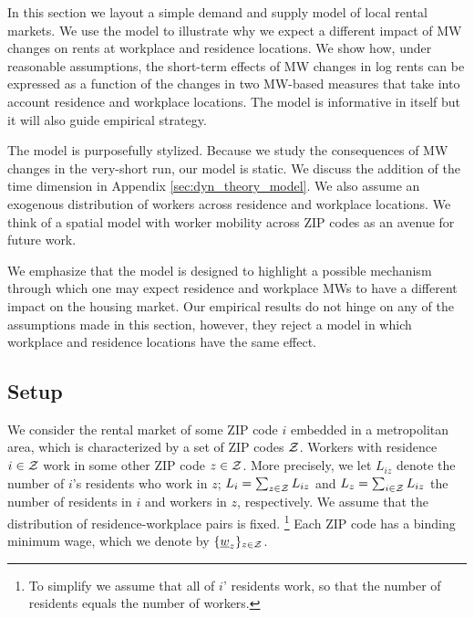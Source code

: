 
In this section we layout a simple demand and supply model of local rental markets.
We use the model to illustrate why we expect a different impact of MW changes 
on rents at workplace and residence locations. We show how, under reasonable 
assumptions, the short-term effects of MW changes in log rents can be expressed 
as a function of the changes in two MW-based measures that take into account 
residence and workplace locations. The model is informative in itself but it will
also guide empirical strategy.

The model is purposefully stylized.
Because we study the consequences of MW changes in the very-short run, our model is 
static. 
We discuss the addition of the time dimension in Appendix \ref{sec:dyn_theory_model}.
We also assume an exogenous distribution of workers across residence and workplace 
locations.
We think of a spatial model with worker mobility across ZIP codes as an avenue 
for future work.

We emphasize that the model is designed to highlight a possible mechanism through 
which one may expect residence and workplace MWs to have a different impact on the 
housing market. Our empirical results do not hinge on any of the assumptions made 
in this section, however, they reject a model in which workplace and residence locations
have the same effect.

\subsection{Setup}

We consider the rental market of some ZIP code $i$ embedded in a metropolitan area, 
which is characterized by a set of ZIP codes $\mathcal{Z}$.
Workers with residence $i\in\mathcal{Z}$ work in some other ZIP code $z\in\mathcal{Z}$. 
More precisely, we let $L_{iz}$ denote the number of $i$'s residents who work in $z$;
$L_i = \sum_{z \in \mathcal{Z}} L_{iz}$ and $L_z = \sum_{i \in \mathcal{Z}} L_{iz}$ 
the number of residents in $i$ and workers in $z$, respectively.
We assume that the distribution of residence-workplace pairs is fixed.%
\footnote{To simplify we assume that all of $i$' residents work, so that the number
of residents equals the number of workers.}
Each ZIP code has a binding minimum wage, which we denote by 
$\{\underline{w}_z\}_{z\in\mathcal{Z}}$.

